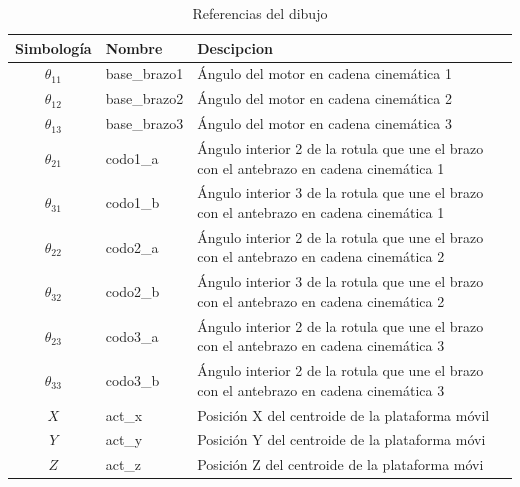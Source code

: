         \begingroup
            \renewcommand{\arraystretch}{1.5}
            \begin{table}[H]
                \centering
                \begin{tabular}{|c|m{2.5cm}|m{8cm}|}
                   \hline
                   \textbf{Simbología}  &  \textbf{Nombre}  & \textbf{Descipcion}    \\\hline
                   $\theta_{11}$  & base\_brazo1    & Ángulo del motor en cadena cinemática 1                       \\\hline
                   $\theta_{12}$  & base\_brazo2    & Ángulo del motor en cadena cinemática 2                            \\\hline
                   $\theta_{13}$  & base\_brazo3    & Ángulo del motor en cadena cinemática 3                            \\\hline
                   $\theta_{21}$  & codo1\_a    & Ángulo interior 2 de la rotula que une el brazo con el antebrazo en cadena cinemática 1                       \\\hline
                   $\theta_{31}$  & codo1\_b    & Ángulo interior 3 de la rotula que une el brazo con el antebrazo en cadena cinemática 1                       \\\hline
                   $\theta_{22}$  & codo2\_a    & Ángulo interior 2 de la rotula que une el brazo con el antebrazo en cadena cinemática 2                       \\\hline
                   $\theta_{32}$  & codo2\_b    & Ángulo interior 3 de la rotula que une el brazo con el antebrazo en cadena cinemática 2                       \\\hline
                   $\theta_{23}$  & codo3\_a    & Ángulo interior 2 de la rotula que une el brazo con el antebrazo en cadena cinemática 3                       \\\hline
                   $\theta_{33}$  & codo3\_b    & Ángulo interior 2 de la rotula que une el brazo con el antebrazo en cadena cinemática 3                       \\\hline
                   $X$  & act\_x    & Posición X del centroide de la plataforma móvil                       \\\hline
                   $Y$  & act\_y    & Posición Y del centroide de la plataforma móvi                       \\\hline
                   $Z$  & act\_z    & Posición Z del centroide de la plataforma móvi                       \\\hline

                \end{tabular}
                \caption{Referencias del dibujo}
                \label{tab:cap6_rviz_1}
            \end{table}
        \endgroup

